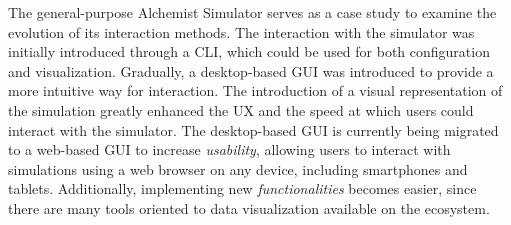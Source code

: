 \documentclass[conference]{IEEEtran}
\begin{document}
The general-purpose Alchemist Simulator serves as a case study to examine the evolution of its interaction methods.
%
The interaction with the simulator was initially introduced through a \ac{CLI},
which could be used for both configuration and visualization.
%
Gradually,
a desktop-based \ac{GUI} was introduced to provide a more intuitive way for interaction.
%
The introduction of a visual representation of the simulation greatly enhanced the \ac{UX} and the speed at which users could interact with the simulator.
%
The desktop-based \ac{GUI} is currently being migrated to a web-based \ac{GUI} to increase \emph{usability},
allowing users to interact with simulations using a web browser on any device,
including smartphones and tablets.
%
Additionally,
implementing new \emph{functionalities} becomes easier,
since there are many tools oriented to data visualization available on the ecosystem.
%
\end{document}
